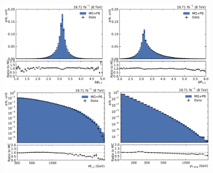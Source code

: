 \begin{figure}[htbp]
    \centering
    \includegraphics[width=0.49\textwidth]{figures/measurement/dijet_quantities_dijet_deltaphi.pdf}\hfill
    \includegraphics[width=0.49\textwidth]{figures/measurement/dijet_quantities_dijet_deltar.pdf}
    \includegraphics[width=0.49\textwidth]{figures/measurement/dijet_quantities_dijet_mass.pdf}\hfill
    \includegraphics[width=0.49\textwidth]{figures/measurement/dijet_quantities_ptavg.pdf}

\end{figure}
